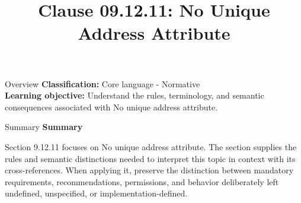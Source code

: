 \documentclass[10pt,letterpaper]{article}
\title{Clause 09.12.11: No Unique Address Attribute}
\author{}
\date{}
\begin{document}
\maketitle
\begin{CornellOverviewBox}{Overview}
\textbf{Classification:} Core language - Normative\\[2pt]
\textbf{Learning objective:} Understand the rules, terminology, and semantic consequences associated with No unique address attribute.
\end{CornellOverviewBox}\begin{CornellSummaryBox}{Summary}
{\sffamily\bfseries\color{Accent} Summary}\par\vspace{3pt}Section 9.12.11 focuses on No unique address attribute. The section supplies the rules and semantic distinctions needed to interpret this topic in context with its cross-references. When applying it, preserve the distinction between mandatory requirements, recommendations, permissions, and behavior deliberately left undefined, unspecified, or implementation-defined.
\end{CornellSummaryBox}
\end{document}
